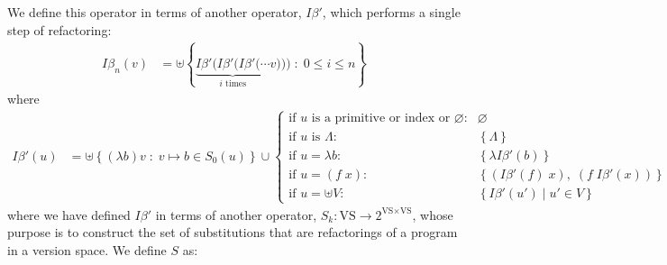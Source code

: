 \documentclass{article}
\begin{document}
We define this operator in terms of another operator, $I\beta'$, which performs a single step of refactoring:
\begin{align*}
  I\beta_n(v)& = \uplus \left\{ \underbrace{I\beta'(I\beta'(I\beta'(\cdots}_{i \text{ times}} v))) \;:\; 0\leq i \leq n \right\}
\end{align*}
where
  \begin{align*}
    I\beta'(u)& = \uplus \left\{(\lambda b)v\;:\;v\mapsto b\in S_0(u)%
    \right\}\cup
  \begin{cases}
    \text{if $u$ is a primitive or index or $\varnothing $:}&\varnothing\\
    \text{if $u$ is $\Lambda$:}&\left\{\Lambda \right\}\\
    \text{if $u = \lambda b$:}&\left\{\lambda I\beta'(b) \right\}\\
    \text{if $u = (f\;x)$:}&\left\{(I\beta'(f)\;x),\;(f\;I\beta'(x)) \right\}\\
    \text{if $u = \uplus V$:}&\left\{I\beta'(u')\;|\;u'\in V \right\}
  \end{cases}  
  \end{align*}
  where we have defined $I\beta'$
  in terms of another operator, $S_k:\text{VS}\to 2^{\text{VS}\times\text{VS}}$,
  whose purpose is to construct the set of
  substitutions that are refactorings of a program in a version space.
We define $S$ as:
\end{document}
